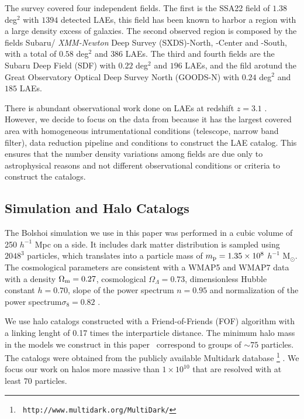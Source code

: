 \documentclass[usenatbib]{mn2e}
\newcommand{\documentname}{paper~}
\newcommand{\hMsun}{{\ifmmode{h^{-1}{\rm
        {M_{\odot}}}}\else{$h^{-1}{\rm{M_{\odot}}}$}\fi}}
\begin{document}
The survey covered four independent fields. The first is the SSA22
field of $1.38$ deg$^2$ with $1394$ detected LAEs, this field has been
known to harbor a region with a large density excess of galaxies. The
second observed region is composed by the fields Subaru/{\it
  XMM-Newton} Deep Survey (SXDS)-North, -Center and -South, with a 
total of $0.58$ deg$^2$ and $386$ LAEs. The third and fourth fields
are the Subaru Deep Field (SDF) with $0.22$ deg$^2$ and $196$ LAEs,
and the fild arotund the Great Observatory Optical Deep Survey North
(GOODS-N) with $0.24$ deg$^2$ and $185$ LAEs. 

There is abundant observational work done on LAEs at redshift $z=3.1$
\citep{Kudritzki2000,Matsuda2005,Gawiser2007,Nilsson2007,Ouchi2008}.
However, we decide to focus on the data from \cite{Yamada2012} because
it has the largest covered area with homogeneous intrumentational
conditions (telescope, narrow band filter), data reduction pipeline
and conditions to construct the LAE catalog. This ensures that the
number density variations among fields are due only to
astrophysical reasons and not different observational conditions or
criteria to construct the catalogs.

\subsection{Simulation and Halo Catalogs}

The Bolshoi simulation \citep{Bolshoi} we use in this paper was
performed in a cubic volume of 250 $h^{-1}$ Mpc on a side. It includes
dark matter distribution is sampled using $2048^{3}$ particles, which
translates into a particle mass of $m_{\rm   p}=1.35\times 10^{8}$
$h^{-1}$ M$_{\odot}$.  The cosmological parameters are consistent with
a WMAP5 and WMAP7 data with a  density $\Omega_{\rm m} = 0.27$,
cosmological  $\Omega_{\Lambda}=0.73$, dimensionless Hubble constant
$h=0.70$, slope of the power spectrum $n=0.95$ and normalization of the
power spectrum$\sigma_{8}=0.82$ \citep{Komatsu2009,Jarosik2011}.  

We use halo catalogs constructed with a Friend-of-Friends (FOF)
algorithm with a linking lenght of 0.17 times the interparticle
distance. The minimum halo mass in the models we construct in this \documentname
correspond to groups of $\sim 75$ particles. The catalogs were
obtained from the publicly available Multidark database \footnote{{\tt
    http://www.multidark.org/MultiDark/}} \citep{2011arXiv1109.0003R}.
We focus our work on halos more massive than $1\times 10^{10}$\hMsun
that are resolved with at least $70$ particles.
\end{document}
